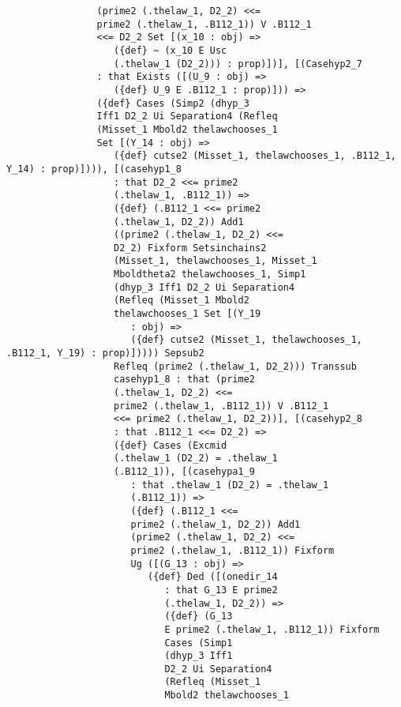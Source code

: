 \documentclass[12pt]{article}
\begin{document}
\begin{verbatim}
                (prime2 (.thelaw_1, D2_2) <<= 
                prime2 (.thelaw_1, .B112_1)) V .B112_1 
                <<= D2_2 Set [(x_10 : obj) => 
                   ({def} ~ (x_10 E Usc 
                   (.thelaw_1 (D2_2))) : prop)])], [(Casehyp2_7 
                : that Exists ([(U_9 : obj) => 
                   ({def} U_9 E .B112_1 : prop)])) => 
                ({def} Cases (Simp2 (dhyp_3 
                Iff1 D2_2 Ui Separation4 (Refleq 
                (Misset_1 Mbold2 thelawchooses_1 
                Set [(Y_14 : obj) => 
                   ({def} cutse2 (Misset_1, thelawchooses_1, .B112_1, Y_14) : prop)]))), [(casehyp1_8 
                   : that D2_2 <<= prime2 
                   (.thelaw_1, .B112_1)) => 
                   ({def} (.B112_1 <<= prime2 
                   (.thelaw_1, D2_2)) Add1 
                   ((prime2 (.thelaw_1, D2_2) <<= 
                   D2_2) Fixform Setsinchains2 
                   (Misset_1, thelawchooses_1, Misset_1 
                   Mboldtheta2 thelawchooses_1, Simp1 
                   (dhyp_3 Iff1 D2_2 Ui Separation4 
                   (Refleq (Misset_1 Mbold2 
                   thelawchooses_1 Set [(Y_19 
                      : obj) => 
                      ({def} cutse2 (Misset_1, thelawchooses_1, .B112_1, Y_19) : prop)])))) Sepsub2 
                   Refleq (prime2 (.thelaw_1, D2_2))) Transsub 
                   casehyp1_8 : that (prime2 
                   (.thelaw_1, D2_2) <<= 
                   prime2 (.thelaw_1, .B112_1)) V .B112_1 
                   <<= prime2 (.thelaw_1, D2_2))], [(casehyp2_8 
                   : that .B112_1 <<= D2_2) => 
                   ({def} Cases (Excmid 
                   (.thelaw_1 (D2_2) = .thelaw_1 
                   (.B112_1)), [(casehypa1_9 
                      : that .thelaw_1 (D2_2) = .thelaw_1 
                      (.B112_1)) => 
                      ({def} (.B112_1 <<= 
                      prime2 (.thelaw_1, D2_2)) Add1 
                      (prime2 (.thelaw_1, D2_2) <<= 
                      prime2 (.thelaw_1, .B112_1)) Fixform 
                      Ug ([(G_13 : obj) => 
                         ({def} Ded ([(onedir_14 
                            : that G_13 E prime2 
                            (.thelaw_1, D2_2)) => 
                            ({def} (G_13 
                            E prime2 (.thelaw_1, .B112_1)) Fixform 
                            Cases (Simp1 
                            (dhyp_3 Iff1 
                            D2_2 Ui Separation4 
                            (Refleq (Misset_1 
                            Mbold2 thelawchooses_1 

\end{verbatim}
\end{document}
